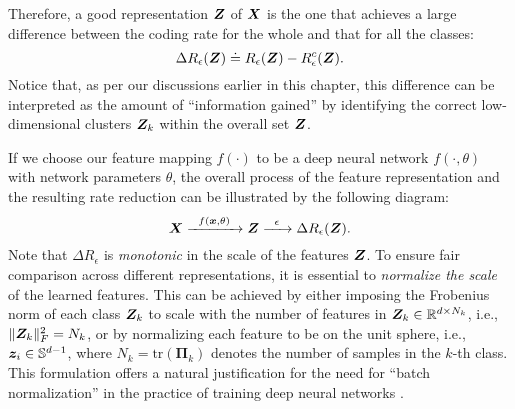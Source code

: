 \documentclass[../../book-main.tex]{subfiles}
\begin{document}

Therefore, a good representation $\bm{Z}$ of $\bm{X}$ is the one that achieves a large difference between the coding rate for the whole and that for all the classes:
\begin{equation}
	\Delta R_{\epsilon}(\bm{Z}) \doteq R_{\epsilon}(\bm{Z}) - R_{\epsilon}^c(\bm{Z}).
	\label{chap4-eqn:coding-length-reduction}
\end{equation}
Notice that, as per our discussions earlier in this chapter, this difference can be interpreted as the amount of ``information gained'' by identifying the correct low-dimensional clusters $\bm{Z}_k$ within the overall set $\bm{Z}$.

If we choose our feature mapping $f(\cdot)$ to be a deep neural network $f(\cdot,\theta)$ with network parameters $\theta$, the overall process of the feature representation and the resulting rate reduction  can be illustrated by the following diagram:
\begin{equation}
	\bm{X}
	\xrightarrow{\hspace{2mm} f(\bm{x}, \theta)\hspace{2mm}} \bm{Z}  \xrightarrow{\hspace{2mm} \epsilon \hspace{2mm}} \Delta R_{\epsilon}(\bm{Z}).
	\label{chap4-eqn:flow}
\end{equation}
Note that $\Delta R_{\epsilon}$ is {\em monotonic} in the scale of the features $\bm{Z}$. To ensure fair comparison across different representations, it is essential to {\em normalize the scale} of the learned features. This can be achieved by either imposing the Frobenius norm of each class $\bm{Z}_k$ to scale with the number of features in $\bm{Z}_k \in \mathbb R^{d \times N_k}$, i.e., $\|\bm{Z}_k\|_F^2 = N_k$, or by normalizing each feature to be on the unit sphere, i.e., $\bm{z}_i \in \mathbb{S}^{d-1}$, where $N_k=\mathrm{tr}(\bm \Pi_k)$ denotes the number of samples in the $k$-th class. This formulation offers a natural justification for the need for ``batch normalization'' in the practice of
training deep neural networks \cite{ioffe2015batch}. %
\end{document}

